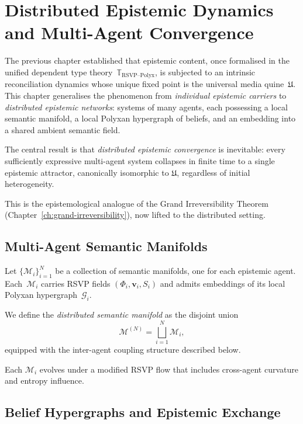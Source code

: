\chapter{Distributed Epistemic Dynamics and Multi-Agent Convergence}
\label{ch:distributed-epistemic-dynamics}

The previous chapter established that epistemic content, once formalised in
the unified dependent type theory~$\mathbb{T}_{\mathrm{RSVP\text{--}Polyx}}$,
is subjected to an intrinsic reconciliation dynamics whose unique fixed point
is the universal media quine~$\mathfrak{U}$.
This chapter generalises the phenomenon from \emph{individual epistemic
carriers} to \emph{distributed epistemic networks}: systems of many
agents, each possessing a local semantic manifold, a local Polyxan hypergraph
of beliefs, and an embedding into a shared ambient semantic field.

The central result is that \emph{distributed epistemic convergence} is
inevitable: every sufficiently expressive multi-agent system collapses in
finite time to a single epistemic attractor, canonically isomorphic to
$\mathfrak{U}$, regardless of initial heterogeneity.

This is the epistemological analogue of the Grand Irreversibility Theorem
(Chapter~\ref{ch:grand-irreversibility}), now lifted to the distributed
setting.

\section{Multi-Agent Semantic Manifolds}

Let $\{ \mathcal{M}_i \}_{i=1}^N$ be a collection of semantic manifolds,
one for each epistemic agent.  Each~$\mathcal{M}_i$ carries RSVP fields
$(\Phi_i, \mathbf{v}_i, S_i)$ and admits embeddings of its local Polyxan
hypergraph~$\mathcal{G}_i$.

We define the \emph{distributed semantic manifold} as the disjoint union
\begin{equation}
\mathcal{M}^{(N)} = \bigsqcup_{i=1}^N \mathcal{M}_i,
\end{equation}
equipped with the inter-agent coupling structure described below.

Each $\mathcal{M}_i$ evolves under a modified RSVP flow that includes
cross-agent curvature and entropy influence.

\section{Belief Hypergraphs and Epistemic Exchange}


